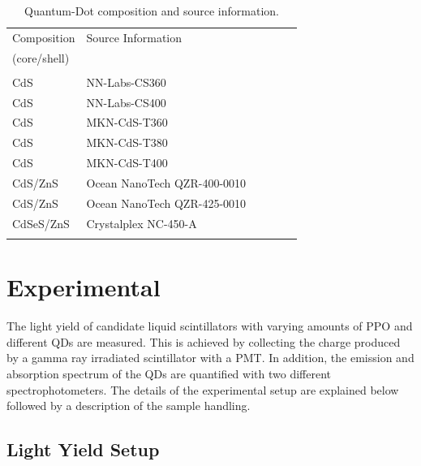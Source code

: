 \documentclass{JINST}
\begin{document}
\begin{table}
\caption{Quantum-Dot composition and source information. \label{quantum_dots_table}}
 \begin{center}
    \begin{tabular}{llllll}
       Composition  & Source Information \\
       (core/shell)  & & \\
       \hline\hline\\[-5px]
         CdS &   NN-Labs-CS360\cite{nnLabs} \\
       \hline
         CdS &    NN-Labs-CS400\cite{nnLabs}   \\
       \hline
         CdS &  MKN-CdS-T360\cite{mkNano} \\
       \hline
         CdS &  MKN-CdS-T380\cite{mkNano}   \\
       \hline
        CdS &  MKN-CdS-T400\cite{mkNano} \\
             \hline
      CdS/ZnS  &  Ocean NanoTech QZR-400-0010\cite{oceanNanotech} \\
       \hline
      CdS/ZnS & Ocean NanoTech QZR-425-0010 \cite{oceanNanotech} \\
      \hline
        CdSeS/ZnS &   Crystalplex NC-450-A \cite{crystalplex} \\
      \\[5px] 
      \hline
 \hline
    \end{tabular}
  \end{center}
\end{table}

\section{Experimental}
\label{exp_sec}
The light yield of candidate liquid scintillators with varying amounts of PPO and different QDs are measured. This is achieved by collecting the charge produced by a gamma ray irradiated scintillator with a PMT. In addition, the emission and absorption spectrum of the QDs are quantified with two different spectrophotometers. The details of the experimental setup are explained below followed by a description of the sample handling.

\subsection{Light Yield Setup}
\label{ly_setup_sec}
\end{document}
